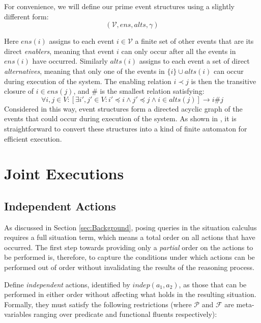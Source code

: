 For convenience, we will define our prime event structures using a
slightly different form:\[
(\mathcal{V},ens,alts,\gamma)\]


Here $ens(i)$ assigns to each event $i\in\mathcal{V}$ a finite set
of other events that are its direct \emph{enablers}, meaning that
event $i$ can only occur after all the events in $ens(i)$ have occurred.
Similarly $alts(i)$ assigns to each event a set of direct \emph{alternatives},
meaning that only one of the events in $\{i\}\cup alts(i)$ can occur
during execution of the system. The enabling relation $i\prec j$
is then the transitive closure of $i\in ens(j)$, and $\#$ is the
smallest relation satisfying:\[
\forall i,j\in V:[\exists i',j'\in V:i'\preceq i\wedge j'\preceq j\wedge i\in alts(j)]\rightarrow i\#j\]
 Considered in this way, event structures form a directed acyclic
graph of the events that could occur during execution of the system.
As shown in \citep{pratt91modeling_conc_with_geom}, it is straightforward
to convert these structures into a kind of finite automaton for efficient
execution.


\section{Joint Executions}

\label{sec:Joint-Execs}


\subsection{Independent Actions}

As discussed in Section \ref{sec:Background}, posing queries in the
situation calculus requires a full situation term, which means a total
order on all actions that have occurred. The first step towards providing
only a \emph{partial} order on the actions to be performed is, therefore,
to capture the conditions under which actions can be performed out
of order without invalidating the results of the reasoning process.

Define \emph{independent} actions, identified by $indep(a_{1},a_{2})$,
as those that can be performed in either order without affecting what
holds in the resulting situation. Formally, they must satisfy the
following restrictions (where $\mathcal{P}$ and $\mathcal{F}$ are
meta-variables ranging over predicate and functional fluents respectively):

